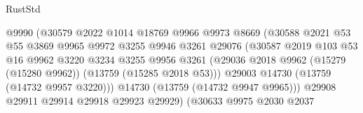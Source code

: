 \begin{lexlean}{RustStd}
\begin{coremodule}
                                        @9990
                                        (@30579
                                          @2022
                                          @1014
                                          @18769
                                          @9966
                                          @9973
                                          @8669
                                          (@30588
                                            @2021
                                            @53
                                            @55
                                            @3869
                                            @9965
                                            @9972
                                            @3255
                                            @9946
                                            @3261
                                            @29076
                                            (@30587
                                              @2019
                                              @103
                                              @53
                                              @16
                                              @9962
                                              @3220
                                              @3234
                                              @3255
                                              @9956
                                              @3261
                                              (@29036
                                                @2018
                                                @9962
                                                (@15279 (@15280 @9962))
                                                (@13759 (@15285 @2018 @53)))
                                              @29003
                                              @14730
                                              (@13759 (@14732 @9957 @3220)))
                                            @14730
                                            (@13759 (@14732 @9947 @9965)))
                                          @29908
                                          @29911
                                          @29914
                                          @29918
                                          @29923
                                          @29929)
                                        (@30633
                                          @9975
                                          @2030
                                          @2037

\end{coremodule}
\end{lexlean}
